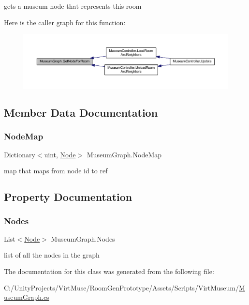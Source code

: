gets a museum node that represents this room 

Here is the caller graph for this function\+:\nopagebreak
\begin{figure}[H]
\begin{center}
\leavevmode
\includegraphics[width=350pt]{class_museum_graph_a82509a5eb8dd2020aaee17261bedb974_icgraph}
\end{center}
\end{figure}


\subsection{Member Data Documentation}
\mbox{\label{class_museum_graph_a79484680da9ead2da6cca2a8225458e5}} 
\subsubsection{\texorpdfstring{Node\+Map}{NodeMap}}
{\footnotesize\ttfamily Dictionary$<$uint, \mbox{\hyperlink{class_museum_graph_1_1_node}{Node}}$>$ Museum\+Graph.\+Node\+Map\hspace{0.3cm}{\ttfamily [private]}}



map that maps from node id to ref 



\subsection{Property Documentation}
\mbox{\label{class_museum_graph_aa166ad4620069c3aaa4b87fd3ae4bfd7}} 
\subsubsection{\texorpdfstring{Nodes}{Nodes}}
{\footnotesize\ttfamily List$<$\mbox{\hyperlink{class_museum_graph_1_1_node}{Node}}$>$ Museum\+Graph.\+Nodes\hspace{0.3cm}{\ttfamily [get]}}



list of all the nodes in the graph 



The documentation for this class was generated from the following file\+:\begin{DoxyCompactItemize}
\item 
C\+:/\+Unity\+Projects/\+Virt\+Muse/\+Room\+Gen\+Prototype/\+Assets/\+Scripts/\+Virt\+Museum/\mbox{\hyperlink{_museum_graph_8cs}{Museum\+Graph.\+cs}}\end{DoxyCompactItemize}
